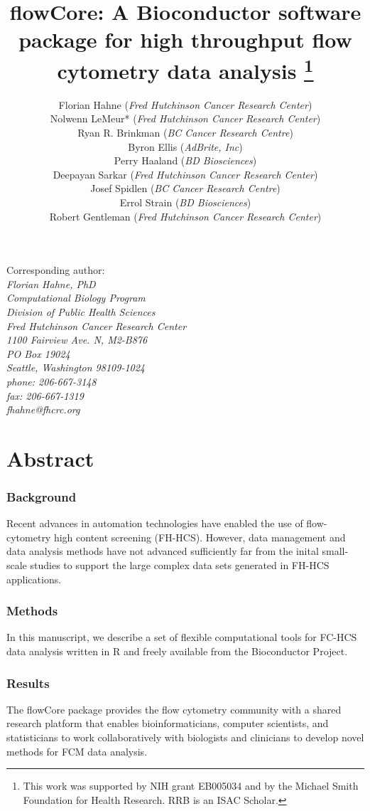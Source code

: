 \documentclass[12pt]{article}
\title{flowCore: A Bioconductor software package for high throughput
  flow cytometry data analysis \footnote{This work was supported by
    NIH grant EB005034 and by the Michael Smith Foundation for Health
    Research. RRB is an ISAC Scholar.}}
\author{Florian Hahne (\textit{Fred Hutchinson Cancer Research
    Center})\\
  Nolwenn LeMeur* (\textit{Fred Hutchinson Cancer Research Center})\\
  Ryan R. Brinkman (\textit{BC Cancer Research Centre})\\
  Byron Ellis (\textit{AdBrite, Inc})\\
  Perry Haaland (\textit{BD Biosciences})\\
  Deepayan Sarkar (\textit{Fred Hutchinson Cancer Research
    Center})\\
  Josef Spidlen (\textit{BC Cancer Research Centre})\\
  Errol Strain (\textit{BD Biosciences})\\
  Robert Gentleman (\textit{Fred Hutchinson Cancer Research
    Center})\\
}
\newcommand{\Rpackage}[1]{{\textsf{#1}}}
\begin{document}
\begin{singlespace}
\maketitle

Corresponding author:\\
\textit{
  Florian Hahne, PhD\\
  Computational Biology Program\\
  Division of Public Health Sciences\\
  Fred Hutchinson Cancer Research Center\\
  1100 Fairview Ave. N, M2-B876\\
  PO Box 19024\\
  Seattle, Washington 98109-1024\\
  phone: 206-667-3148\\
  fax: 206-667-1319\\
  fhahne@fhcrc.org
}


\end{singlespace}

\section*{Abstract}
\subsubsection*{Background}
Recent advances in automation technologies have enabled the use of
flow-cytometry high content screening (FH-HCS). However, data
management and data analysis methods have not advanced sufficiently
far from the inital small-scale studies to support the large complex
data sets generated in FH-HCS applications.
\subsubsection*{Methods}
In this manuscript, we describe a set of flexible
computational tools for FC-HCS data analysis written 
in R and freely available from the Bioconductor Project.

\subsubsection*{Results}
The \Rpackage{flowCore} package provides the flow cytometry community
with a shared research platform that enables bioinformaticians,
computer scientists, and statisticians to work collaboratively with
biologists and clinicians to develop novel methods for FCM data
analysis.
\end{document}

